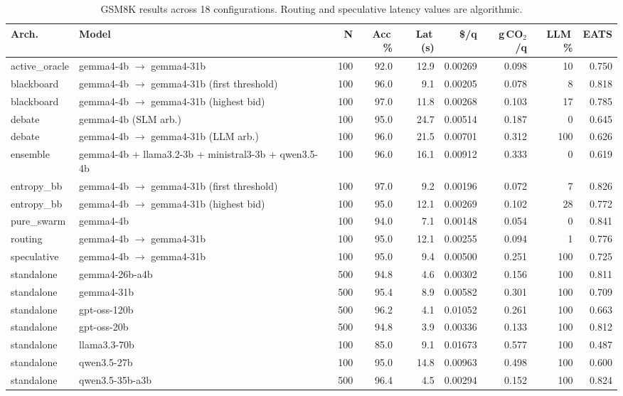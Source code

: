 \begin{table}[htbp]
\centering
\caption{GSM8K results across 18 configurations. Routing and speculative latency values are algorithmic.}
\label{tab:result-gsm8k}
\scriptsize
\renewcommand{\arraystretch}{1.15}
\begin{tabularx}{\linewidth}{@{} l X r r r r r r r @{}}
\toprule
\textbf{Arch.} & \textbf{Model} & \textbf{N} & \textbf{Acc\,\%} & \textbf{Lat\,(s)} & \textbf{\$/q} & \textbf{g\,CO$_2$/q} & \textbf{LLM\,\%} & \textbf{EATS} \\
\midrule
active\_oracle & gemma4-4b $\rightarrow$ gemma4-31b & 100 & 92.0 & 12.9 & 0.00269 & 0.098 & 10 & 0.750 \\
blackboard & gemma4-4b $\rightarrow$ gemma4-31b (first threshold) & 100 & 96.0 & 9.1 & 0.00205 & 0.078 & 8 & 0.818 \\
blackboard & gemma4-4b $\rightarrow$ gemma4-31b (highest bid) & 100 & 97.0 & 11.8 & 0.00268 & 0.103 & 17 & 0.785 \\
debate & gemma4-4b (SLM arb.) & 100 & 95.0 & 24.7 & 0.00514 & 0.187 & 0 & 0.645 \\
debate & gemma4-4b $\rightarrow$ gemma4-31b (LLM arb.) & 100 & 96.0 & 21.5 & 0.00701 & 0.312 & 100 & 0.626 \\
ensemble & gemma4-4b + llama3.2-3b + ministral3-3b + qwen3.5-4b & 100 & 96.0 & 16.1 & 0.00912 & 0.333 & 0 & 0.619 \\
entropy\_bb & gemma4-4b $\rightarrow$ gemma4-31b (first threshold) & 100 & 97.0 & 9.2 & 0.00196 & 0.072 & 7 & 0.826 \\
entropy\_bb & gemma4-4b $\rightarrow$ gemma4-31b (highest bid) & 100 & 95.0 & 12.1 & 0.00269 & 0.102 & 28 & 0.772 \\
pure\_swarm & gemma4-4b & 100 & 94.0 & 7.1 & 0.00148 & 0.054 & 0 & 0.841 \\
routing & gemma4-4b $\rightarrow$ gemma4-31b & 100 & 95.0 & 12.1 & 0.00255 & 0.094 & 1 & 0.776 \\
speculative & gemma4-4b $\rightarrow$ gemma4-31b & 100 & 95.0 & 9.4 & 0.00500 & 0.251 & 100 & 0.725 \\
standalone & gemma4-26b-a4b & 500 & 94.8 & 4.6 & 0.00302 & 0.156 & 100 & 0.811 \\
standalone & gemma4-31b & 500 & 95.4 & 8.9 & 0.00582 & 0.301 & 100 & 0.709 \\
standalone & gpt-oss-120b & 500 & 96.2 & 4.1 & 0.01052 & 0.261 & 100 & 0.663 \\
standalone & gpt-oss-20b & 500 & 94.8 & 3.9 & 0.00336 & 0.133 & 100 & 0.812 \\
standalone & llama3.3-70b & 100 & 85.0 & 9.1 & 0.01673 & 0.577 & 100 & 0.487 \\
standalone & qwen3.5-27b & 100 & 95.0 & 14.8 & 0.00963 & 0.498 & 100 & 0.600 \\
standalone & qwen3.5-35b-a3b & 500 & 96.4 & 4.5 & 0.00294 & 0.152 & 100 & 0.824 \\
\bottomrule
\end{tabularx}
\end{table}

